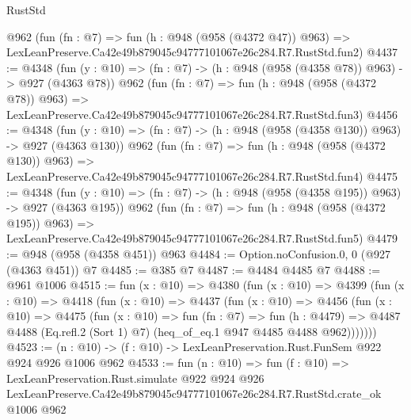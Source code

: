 \begin{lexlean}{RustStd}
\begin{coremodule}
    @962
    (fun (fn : @7) =>
    fun (h : @948 (@958 (@4372 @47)) @963) =>
    LexLeanPreserve.Ca42e49b879045c94777101067e26c284.R7.RustStd.fun2)
@4437 := @4348
    (fun (y : @10) => (fn : @7) -> (h : @948 (@958 (@4358 @78)) @963) -> @927 (@4363 @78))
    @962
    (fun (fn : @7) =>
    fun (h : @948 (@958 (@4372 @78)) @963) =>
    LexLeanPreserve.Ca42e49b879045c94777101067e26c284.R7.RustStd.fun3)
@4456 := @4348
    (fun (y : @10) => (fn : @7) -> (h : @948 (@958 (@4358 @130)) @963) -> @927 (@4363 @130))
    @962
    (fun (fn : @7) =>
    fun (h : @948 (@958 (@4372 @130)) @963) =>
    LexLeanPreserve.Ca42e49b879045c94777101067e26c284.R7.RustStd.fun4)
@4475 := @4348
    (fun (y : @10) => (fn : @7) -> (h : @948 (@958 (@4358 @195)) @963) -> @927 (@4363 @195))
    @962
    (fun (fn : @7) =>
    fun (h : @948 (@958 (@4372 @195)) @963) =>
    LexLeanPreserve.Ca42e49b879045c94777101067e26c284.R7.RustStd.fun5)
@4479 := @948 (@958 (@4358 @451)) @963
@4484 := Option.noConfusion.{0, 0} (@927 (@4363 @451)) @7
@4485 := @385 @7
@4487 := @4484 @4485 @7
@4488 := @961 @1006
@4515 := fun (x : @10) =>
  @4380
    (fun (x : @10) =>
    @4399
      (fun (x : @10) =>
      @4418
        (fun (x : @10) =>
        @4437
          (fun (x : @10) =>
          @4456
            (fun (x : @10) =>
            @4475
              (fun (x : @10) =>
              fun (fn : @7) =>
              fun (h : @4479) =>
              @4487 @4488 (Eq.refl.{2} (Sort 1) @7) (heq_of_eq.{1} @947 @4485 @4488 @962)))))))
@4523 := (n : @10) -> (f : @10) -> LexLeanPreservation.Rust.FunSem @922 @924 @926 @1006 @962
@4533 := fun (n : @10) =>
  fun (f : @10) =>
  LexLeanPreservation.Rust.simulate
    @922
    @924
    @926
    LexLeanPreserve.Ca42e49b879045c94777101067e26c284.R7.RustStd.crate_ok
    @1006
    @962
\end{coremodule}
\end{lexlean}

